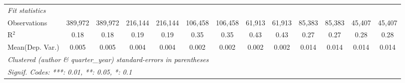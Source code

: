 \begin{tabular}{lcccccccccccc}
   \midrule
   \emph{Fit statistics}\\
   Observations                             & 389,972       & 389,972        & 216,144        & 216,144        & 106,458       & 106,458        & 61,913         & 61,913         & 85,383  & 85,383       & 45,407       & 45,407\\  
   R$^2$                                    & 0.18          & 0.18           & 0.19           & 0.19           & 0.35          & 0.35           & 0.43           & 0.43           & 0.27    & 0.27         & 0.28         & 0.28\\  
Mean(Dep. Var.) & 0.005 & 0.005 & 0.004 & 0.004 & 0.002 & 0.002 & 0.002 & 0.002 & 0.014 & 0.014 & 0.014 & 0.014 \\
   \midrule \midrule
   \multicolumn{13}{l}{\emph{Clustered (author \& quarter\_year) standard-errors in parentheses}}\\
   \multicolumn{13}{l}{\emph{Signif. Codes: ***: 0.01, **: 0.05, *: 0.1}}\\
\end{tabular}
\par\endgroup
